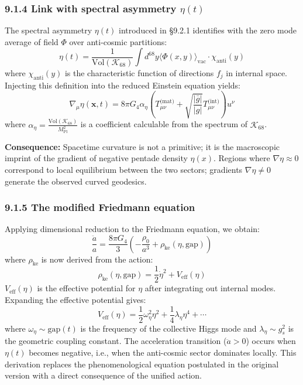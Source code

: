 \documentclass[11pt]{article}
\let\oldmathcal\mathcal
\renewcommand{\mathcal}[1]{\oldmathcal{#1}}
\begin{document}
\hypertarget{link-with-spectral-asymmetry-etat-1}{%
\subsubsection{\texorpdfstring{9.1.4 Link with spectral asymmetry
\(\eta(t)\)}{9.1.4 Link with spectral asymmetry \textbackslash eta(t)}}\label{link-with-spectral-asymmetry-etat-1}}

The spectral asymmetry \(\eta(t)\) introduced in §9.2.1 identifies with
the zero mode average of field \(\Phi\) over anti-cosmic partitions: \[
\eta(t) = \frac{1}{\text{Vol}(\mathcal{K}_{68})} \int d^{68}y \langle \Phi(x,y) \rangle_{\text{vac}} \cdot \chi_{\text{anti}}(y)
\] where \(\chi_{\text{anti}}(y)\) is the characteristic function of
directions \(f_j\) in internal space. Injecting this definition into the
reduced Einstein equation yields: \[
\nabla_\mu \eta(\mathbf{x}, t) = 8\pi G_4 \alpha_\eta \left( T_{\mu\nu}^{\text{(mat)}} + \sqrt{\frac{|\bar{g}|}{|g|}} T_{\mu\nu}^{\text{(int)}} \right) u^\nu
\] where
\(\alpha_\eta = \frac{\text{Vol}(\mathcal{K}_{68})}{M_{\text{Pl}}^2}\)
is a coefficient calculable from the spectrum of \(\mathcal{K}_{68}\).

\textbf{Consequence:} Spacetime curvature is not a primitive; it is the
macroscopic imprint of the gradient of negative pentade density
\(\eta(x)\). Regions where \(\nabla \eta \approx 0\) correspond to local
equilibrium between the two sectors; gradients \(\nabla \eta \neq 0\)
generate the observed curved geodesics.

\hypertarget{the-modified-friedmann-equation}{%
\subsubsection{9.1.5 The modified Friedmann
equation}\label{the-modified-friedmann-equation}}

Applying dimensional reduction to the Friedmann equation, we obtain: \[
\boxed{ \frac{\ddot{a}}{a} = \frac{8\pi G_4}{3} \left( -\frac{\rho_0}{a^3} + \rho_{\text{ke}}(\eta, \text{gap}) \right) }
\] where \(\rho_{\text{ke}}\) is now derived from the action: \[
\rho_{\text{ke}}(\eta, \text{gap}) = \frac{1}{2} \dot{\eta}^2 + V_{\text{eff}}(\eta)
\] \(V_{\text{eff}}(\eta)\) is the effective potential for \(\eta\)
after integrating out internal modes. Expanding the effective potential
gives: \[
V_{\text{eff}}(\eta) = \frac{1}{2} \omega_\eta^2 \eta^2 + \frac{1}{4} \lambda_\eta \eta^4 + \cdots
\] where \(\omega_\eta \sim \text{gap}(t)\) is the frequency of the
collective Higgs mode and \(\lambda_\eta \sim g_s^2\) is the geometric
coupling constant. The acceleration transition (\(\ddot{a} > 0\)) occurs
when \(\eta(t)\) becomes negative, i.e., when the anti-cosmic sector
dominates locally. This derivation replaces the phenomenological
equation postulated in the original version with a direct consequence of
the unified action.
\end{document}
